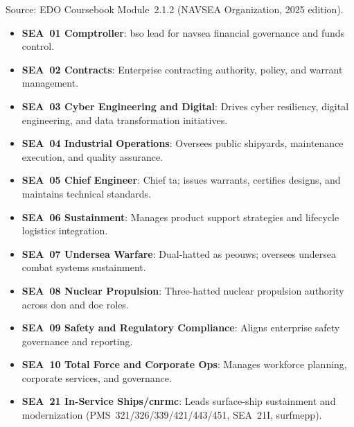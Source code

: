 \documentclass[../main.tex]{subfiles}
\begin{document}
\begin{description}[style=nextline, labelsep=0.5em, font=\bfseries]
	\item[\textbf{NAVSEA headquarters roles.}]
	Source: EDO Coursebook Module~2.1.2 (NAVSEA Organization, 2025 edition).
      \begin{itemize}
        \item \textbf{SEA~01 Comptroller}: \ac{bso} lead for \ac{navsea} financial governance and funds control.
        \item \textbf{SEA~02 Contracts}: Enterprise contracting authority, policy, and warrant management.
        \item \textbf{SEA~03 Cyber Engineering and Digital}: Drives cyber resiliency, digital engineering, and data transformation initiatives.
        \item \textbf{SEA~04 Industrial Operations}: Oversees public shipyards, maintenance execution, and quality assurance.
        \item \textbf{SEA~05 Chief Engineer}: Chief \ac{ta}; issues warrants, certifies designs, and maintains technical standards.
        \item \textbf{SEA~06 Sustainment}: Manages product support strategies and lifecycle logistics integration.
        \item \textbf{SEA~07 Undersea Warfare}: Dual-hatted as \ac{peouws}; oversees undersea combat systems sustainment.
        \item \textbf{SEA~08 Nuclear Propulsion}: Three-hatted nuclear propulsion authority across \ac{don} and \ac{doe} roles.
        \item \textbf{SEA~09 Safety and Regulatory Compliance}: Aligns enterprise safety governance and reporting.
        \item \textbf{SEA~10 Total Force and Corporate Ops}: Manages workforce planning, corporate services, and governance.
        \item \textbf{SEA~21 In-Service Ships/\ac{cnrmc}}: Leads surface-ship sustainment and modernization (PMS~321/326/339/421/443/451, SEA~21I, \ac{surfmepp}).
      \end{itemize}


\end{description}
\end{document}
